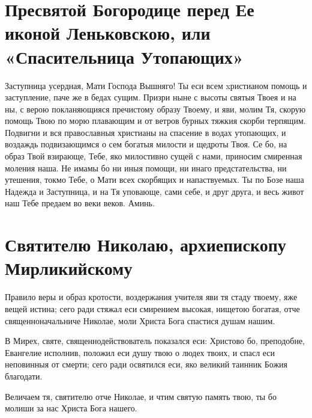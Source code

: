 \section{Пресвятой Богородице перед Ее иконой Леньковскою, или «Спасительница Утопающих»}
 




Заступница усердная, Мати Господа Вышняго! Ты еси всем xристианом помощь и заступление, паче же в бедах сущим. Призри ныне с высоты святыя Твоея и на ны, с верою покланяющияся пречистому образу Твоему, и яви, молим Тя, скорую помощь Твою по морю плавающим и от ветров бурных тяжкия скорби терпящим. Подвигни и вся православныя христианы на спасение в водах утопающих, и воздаждь подвизающимся о сем богатыя милости и щедроты Твоя. Се бо, на образ Твой взирающе, Тебе, яко милостивно сущей с нами, приносим смиренная моления наша. Не имамы бо ни иныя помощи, ни инаго предстательства, ни утешения, токмо Тебе, о Мати всех скорбящих и напаствуемых. Ты по Бозе наша Надежда и Заступница, и на Тя уповающе, сами себе, и друг друга, и весь живот наш Тебе предаем во веки веков. Аминь.


\section{Святителю Николаю, архиепископу Мирликийскому}
 




Правило веры и образ кротости, воздержания учителя яви тя стаду твоему, яже вещей истина; сего ради стяжал еси смирением высокая, нищетою богатая, отче священноначальниче Николае, моли Христа Бога спастися душам нашим.




В Мирех, святе, священнодействователь показался еси: Христово бо, преподобне, Евангелие исполнив, положил еси душу твою о людех твоих, и спасл еси неповинныя от смерти; сего ради освятился еси, яко великий таинник Божия благодати.




Величаем тя, святителю отче Николае, и чтим святую память твою, ты бо молиши за нас Христа Бога нашего.




